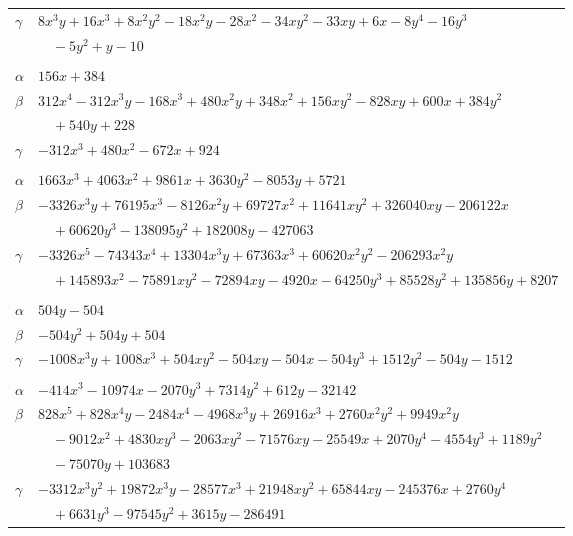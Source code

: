 \documentclass[11pt]{article}
\begin{document}
\begin{longtable}{@{}ll@{}}
$\gamma$ & $8x^{3}y+16x^{3}+8x^{2}y^{2}-18x^{2}y-28x^{2}-34xy^{2}-33xy+6x-8y^{4}-16y^{3}$\\
 & $\quad -5y^{2}+y-10$\\
\addlinespace[3pt]
\multicolumn{2}{@{}l}{$\{i,j\}=\{36,40\}$, $k_{ij}=2^{4}\cdot 3^{3}\cdot 5$}\\
$\alpha$ & $156x+384$\\
$\beta$ & $312x^{4}-312x^{3}y-168x^{3}+480x^{2}y+348x^{2}+156xy^{2}-828xy+600x+384y^{2}$\\
 & $\quad +540y+228$\\
$\gamma$ & $-312x^{3}+480x^{2}-672x+924$\\
\addlinespace[3pt]
\multicolumn{2}{@{}l}{$\{i,j\}=\{39,40\}$, $k_{ij}=2^{2}\cdot 3^{3}\cdot 5^{2}\cdot 7$}\\
$\alpha$ & $1663x^{3}+4063x^{2}+9861x+3630y^{2}-8053y+5721$\\
$\beta$ & $-3326x^{3}y+76195x^{3}-8126x^{2}y+69727x^{2}+11641xy^{2}+326040xy-206122x$\\
 & $\quad +60620y^{3}-138095y^{2}+182008y-427063$\\
$\gamma$ & $-3326x^{5}-74343x^{4}+13304x^{3}y+67363x^{3}+60620x^{2}y^{2}-206293x^{2}y$\\
 & $\quad +145893x^{2}-75891xy^{2}-72894xy-4920x-64250y^{3}+85528y^{2}+135856y+8207$\\
\addlinespace[3pt]
\multicolumn{2}{@{}l}{$\{i,j\}=\{40,49\}$, $k_{ij}=2^{5}\cdot 3^{2}\cdot 7$}\\
$\alpha$ & $504y-504$\\
$\beta$ & $-504y^{2}+504y+504$\\
$\gamma$ & $-1008x^{3}y+1008x^{3}+504xy^{2}-504xy-504x-504y^{3}+1512y^{2}-504y-1512$\\
\addlinespace[3pt]
\multicolumn{2}{@{}l}{$\{i,j\}=\{40,53\}$, $k_{ij}=2^{2}\cdot 3^{4}\cdot 5^{2}\cdot 7$}\\
$\alpha$ & $-414x^{3}-10974x-2070y^{3}+7314y^{2}+612y-32142$\\
$\beta$ & $828x^{5}+828x^{4}y-2484x^{4}-4968x^{3}y+26916x^{3}+2760x^{2}y^{2}+9949x^{2}y$\\
 & $\quad -9012x^{2}+4830xy^{3}-2063xy^{2}-71576xy-25549x+2070y^{4}-4554y^{3}+1189y^{2}$\\
 & $\quad -75070y+103683$\\
$\gamma$ & $-3312x^{3}y^{2}+19872x^{3}y-28577x^{3}+21948xy^{2}+65844xy-245376x+2760y^{4}$\\
 & $\quad +6631y^{3}-97545y^{2}+3615y-286491$\\

\end{longtable}
\end{document}
